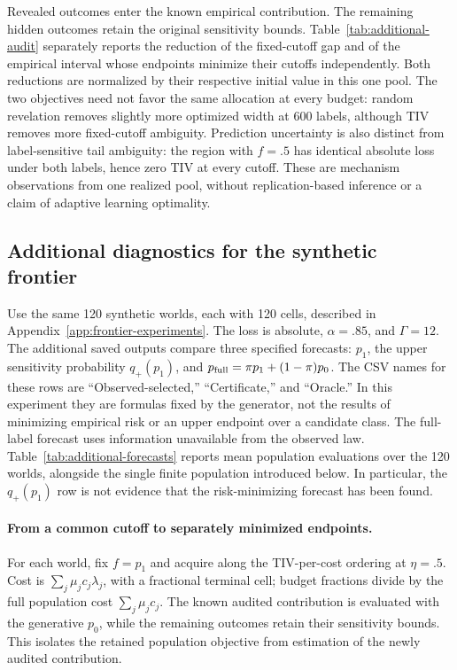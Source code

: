 Revealed outcomes enter the known empirical contribution. The remaining hidden
outcomes retain the original sensitivity bounds. Table~\ref{tab:additional-audit}
separately reports the reduction of the fixed-cutoff gap and of the empirical
interval whose endpoints minimize their cutoffs independently. Both reductions
are normalized by their respective initial value in this one pool. The two
objectives need not favor the same allocation at every budget: random revelation
removes slightly more optimized width at 600 labels, although TIV removes more
fixed-cutoff ambiguity. Prediction uncertainty is also distinct from label-sensitive
tail ambiguity: the region with $f=.5$ has identical absolute loss under both
labels, hence zero TIV at every cutoff. These are mechanism observations from
one realized pool, without replication-based inference or a claim of adaptive
learning optimality.

\SupplementFixedAuditTable
\FloatBarrier

\subsection{Additional diagnostics for the synthetic frontier}
\label{app:additional-frontier}

Use the same 120 synthetic worlds, each with 120 cells, described in
Appendix~\ref{app:frontier-experiments}. The loss is absolute, $\alpha=.85$, and
$\Gamma=12$. The additional saved outputs compare three specified forecasts:
$p_1$, the upper sensitivity probability $q_+(p_1)$, and
$p_{\rm full}=\pi p_1+(1-\pi)p_0$. The CSV names for these rows are
``Observed-selected,'' ``Certificate,'' and ``Oracle.'' In this experiment they
are formulas fixed by the generator, not the results of minimizing empirical
risk or an upper endpoint over a candidate class. The full-label forecast uses
information unavailable from the observed law. Table~\ref{tab:additional-forecasts}
reports mean population evaluations over the 120 worlds, alongside the
single finite population introduced below. In particular, the $q_+(p_1)$ row
is not evidence that the risk-minimizing forecast has been found.

\paragraph{From a common cutoff to separately minimized endpoints.}
For each world, fix $f=p_1$ and acquire along the TIV-per-cost ordering at
$\eta=.5$. Cost is $\sum_j\mu_jc_j\lambda_j$, with a fractional terminal cell;
budget fractions divide by the full population cost $\sum_j\mu_jc_j$.
The known audited contribution is evaluated with the generative $p_0$, while the
remaining outcomes retain their sensitivity bounds. This isolates the retained
population objective from estimation of the newly audited contribution.

